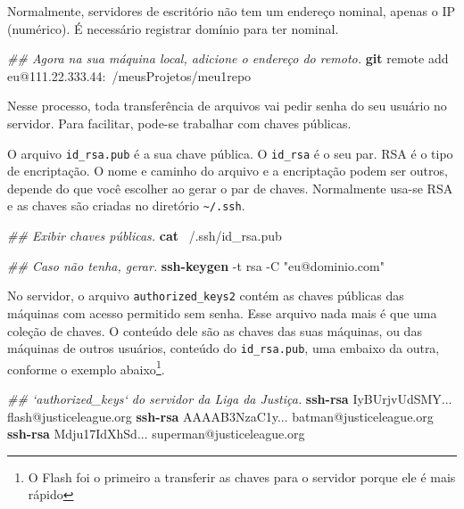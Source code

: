 \documentclass[
  a5paper,
  pagesize,
  9pt,
  pointlessnumbers,
  normalheadings,
  twoside=false
]{book}
\newenvironment{Shaded}{\begin{snugshade}}{\end{snugshade}}
\newcommand{\KeywordTok}[1]{\textcolor[rgb]{0.13,0.29,0.53}{\textbf{{#1}}}}
\newcommand{\StringTok}[1]{\textcolor[rgb]{0.31,0.60,0.02}{{#1}}}
\newcommand{\CommentTok}[1]{\textcolor[rgb]{0.56,0.35,0.01}{\textit{{#1}}}}
\newcommand{\NormalTok}[1]{{#1}}
\let\rmarkdownfootnote\footnote%
\def\footnote{\protect\rmarkdownfootnote}
\begin{document}
Normalmente, servidores de escritório não tem um endereço nominal,
apenas o IP (numérico). É necessário registrar domínio para ter nominal.

\begin{Shaded}
\begin{Highlighting}[]
\CommentTok{## Agora na sua máquina local, adicione o endereço do remoto.}
\KeywordTok{git} \NormalTok{remote add eu@111.22.333.44:~/meusProjetos/meu1repo}
\end{Highlighting}
\end{Shaded}

Nesse processo, toda transferência de arquivos vai pedir senha do seu
usuário no servidor. Para facilitar, pode-se trabalhar com chaves
públicas.

O arquivo \texttt{id\_rsa.pub} é a sua chave pública. O \texttt{id\_rsa}
é o seu par. RSA é o tipo de encriptação. O nome e caminho do arquivo e
a encriptação podem ser outros, depende do que você escolher ao gerar o
par de chaves. Normalmente usa-se RSA e as chaves são criadas no
diretório \texttt{\textasciitilde{}/.ssh}.

\begin{Shaded}
\begin{Highlighting}[]
\CommentTok{## Exibir chaves públicas.}
\KeywordTok{cat} \NormalTok{~/.ssh/id_rsa.pub}

\CommentTok{## Caso não tenha, gerar.}
\KeywordTok{ssh-keygen} \NormalTok{-t rsa -C }\StringTok{"eu@dominio.com"}
\end{Highlighting}
\end{Shaded}

No servidor, o arquivo \texttt{authorized\_keys2} contém as chaves
públicas das máquinas com acesso permitido sem senha. Esse arquivo nada
mais é que uma coleção de chaves. O conteúdo dele são as chaves das suas
máquinas, ou das máquinas de outros usuários, conteúdo do
\texttt{id\_rsa.pub}, uma embaixo da outra, conforme o exemplo
abaixo\footnote{O Flash foi o
primeiro a transferir as chaves para o servidor porque ele é mais
rápido}.

\begin{Shaded}
\begin{Highlighting}[]
\CommentTok{## `authorized_keys` do servidor da Liga da Justiça.}
\KeywordTok{ssh-rsa} \NormalTok{IyBUrjvUdSMY... flash@justiceleague.org}
\KeywordTok{ssh-rsa} \NormalTok{AAAAB3NzaC1y... batman@justiceleague.org}
\KeywordTok{ssh-rsa} \NormalTok{Mdju17IdXhSd... superman@justiceleague.org}
\end{Highlighting}
\end{Shaded}
\end{document}
